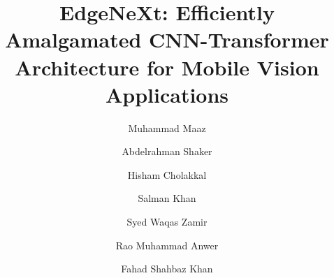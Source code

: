 \documentclass[runningheads]{llncs}
\begin{document}
\pagestyle{headings}
\mainmatter
\def\ECCVSubNumber{197}  

\title{EdgeNeXt: Efficiently Amalgamated CNN-Transformer Architecture for Mobile Vision Applications}

\author{
Muhammad Maaz \and
Abdelrahman Shaker \and
Hisham Cholakkal \and
Salman Khan \and
Syed Waqas Zamir \and
Rao Muhammad Anwer \and
Fahad Shahbaz Khan
}


\begin{comment}
\titlerunning{Abbreviated paper title}
\author{First Author\inst{1}\orcidID{0000-1111-2222-3333} \and
Second Author\inst{2,3}\orcidID{1111-2222-3333-4444} \and
Third Author\inst{3}\orcidID{2222--3333-4444-5555}}
\authorrunning{F. Author et al.}
\institute{Princeton University, Princeton NJ 08544, USA \and
Springer Heidelberg, Tiergartenstr. 17, 69121 Heidelberg, Germany
\email{lncs@springer.com}\\
\url{http://www.springer.com/gp/computer-science/lncs} \and
ABC Institute, Rupert-Karls-University Heidelberg, Heidelberg, Germany\\
\email{\{abc,lncs\}@uni-heidelberg.de}}
\end{comment}
\maketitle
\end{document}
